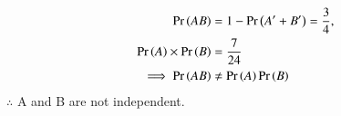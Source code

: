\begin{align}
\Pr\left(AB\right)&=1-\Pr\left(A^{\prime}+B^{\prime}\right)
       =\frac{3}{4},\\
\Pr\left(A\right)\times\Pr\left(B\right)&
                  =\frac{7}{24}\\
\implies              \Pr\left(AB\right)&\neq\Pr\left(A\right)\Pr\left(B\right)
\end{align}
$\therefore$ A and B are not independent.
